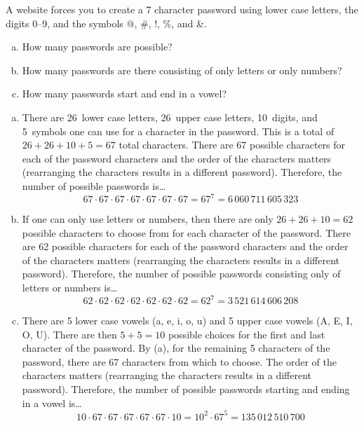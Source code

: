 \documentclass[11pt,letterpaper]{article}
\begin{document}

 A website forces you to create a 7 character password using lower case letters, the digits 0--9, and the symbols @, \#, !, \%, and \&. 
	\begin{enumerate}[(a)]
	\item How many passwords are possible?
	\item How many passwords are there consisting of only letters or only numbers?
	\item How many passwords start and end in a vowel?
	\end{enumerate} \pspace

\sol 
\begin{enumerate}[(a)]
\item There are 26~lower case letters, 26~upper case letters, 10~digits, and 5~symbols one can use for a character in the password. This is a total of $26 + 26 + 10 + 5= 67$ total characters. There are 67 possible characters for each of the password characters and the order of the characters matters (rearranging the characters results in a different password). Therefore, the number of possible passwords is\dots
	\[
	67 \cdot 67 \cdot 67 \cdot 67 \cdot 67 \cdot 67 \cdot 67= 67^7= 6\,060\,711\,605\,323
	\] \pspace

\item If one can only use letters or numbers, then there are only $26 + 26 + 10= 62$ possible characters to choose from for each character of the password. There are 62 possible characters for each of the password characters and the order of the characters matters (rearranging the characters results in a different password). Therefore, the number of possible passwords consisting only of letters or numbers is\dots
	\[
	62 \cdot 62 \cdot 62 \cdot 62 \cdot 62 \cdot 62 \cdot 62= 62^7= 3\,521\,614\,606\,208
	\] \pspace

\item There are 5 lower case vowels (a, e, i, o, u) and 5 upper case vowels (A, E, I, O, U). There are then $5 + 5= 10$ possible choices for the first and last character of the password. By (a), for the remaining 5 characters of the password, there are 67 characters from which to choose. The order of the characters matters (rearranging the characters results in a different password). Therefore, the number of possible passwords starting and ending in a vowel is\dots
	\[
	10 \cdot 67 \cdot 67 \cdot 67 \cdot 67 \cdot 67 \cdot 10= 10^2 \cdot 67^5= 135\,012\,510\,700
	\]
\end{enumerate}
\end{document}
